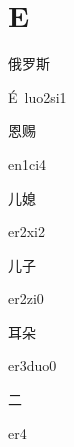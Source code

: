 ﻿%
\section*{E}
\begin{multicols*}{2}

\begin{verbete}[É\ luo2si1]{俄罗斯}
\begin{pronuncia}{É\ luo2si1}
\end{pronuncia}
\end{verbete}

\begin{verbete}[en1ci4]{恩赐}
\begin{pronuncia}{en1ci4}
\end{pronuncia}
\end{verbete}

\begin{verbete}[er2xi2]{儿媳}
\begin{pronuncia}{er2xi2}
\end{pronuncia}
\end{verbete}

\begin{verbete}[er2zi0]{儿子}
\begin{pronuncia}{er2zi0}
\end{pronuncia}
\end{verbete}

\begin{verbete}[er3duo0]{耳朵}
\begin{pronuncia}{er3duo0}
\end{pronuncia}
\end{verbete}

\begin{verbete}[er4]{二}
\begin{pronuncia}{er4}
\end{pronuncia}
\end{verbete}

\end{multicols*}
